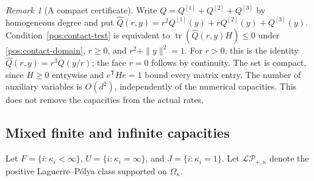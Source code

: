 \documentclass[reqno]{amsart}
\theoremstyle{definition}
\theoremstyle{remark}
\newtheorem{remark}[theorem]{Remark}
\begin{document}
\begin{remark}[A compact certificate]\label{pos:compact}
Write \(Q=Q^{[1]}+Q^{[2]}+Q^{[3]}\) by homogeneous degree and put
\(\widehat Q(r,y)=r^2Q^{[1]}(y)+rQ^{[2]}(y)+Q^{[3]}(y)\).
Condition~\eqref{pos:contact-test} is equivalent to
\(\operatorname{tr}(\widehat Q(r,y)H)\le0\) under
\eqref{pos:contact-domain}, \(r\ge0\), and \(r^2+\|y\|^2=1\).
For \(r>0\), this is the identity \(\widehat Q(r,y)=r^3Q(y/r)\);
the face \(r=0\) follows by continuity.  The set is compact, since
\(H\ge0\) entrywise and \(e^{\mathsf T}He=1\) bound every matrix entry.
The number of auxiliary variables is \(O(d^2)\), independently of the numerical
capacities.  This does not remove the capacities from the actual rates.
\end{remark}

\subsection{Mixed finite and infinite capacities}

Let \(F=\{i:\kappa_i<\infty\}\), \(U=\{i:\kappa_i=\infty\}\), and
\(J=\{i:\kappa_i=1\}\).  Let \(\mathcal{LP}_{+,\kappa}\) denote the positive
Laguerre--P\'olya class supported on \(\Omega_\kappa\).
\end{document}
